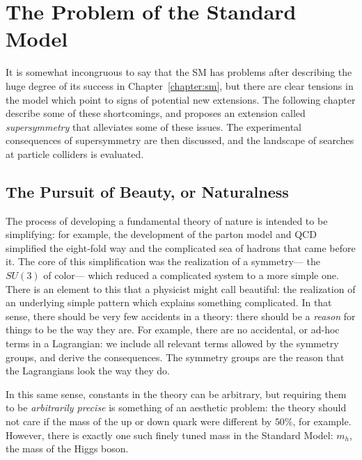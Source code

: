 \label{chapter:susy}

\section{The Problem of the Standard Model}
\label{chapter:susy:problems}

It is somewhat incongruous to say that the SM has problems after describing the huge degree of its success in Chapter~\ref{chapter:sm}, but there are clear tensions in the model which point to signs of potential new extensions. The following chapter describe some of these shortcomings, and proposes an extension called \textit{supersymmetry} that alleviates some of these issues. The experimental consequences of supersymmetry are then discussed, and the landscape of searches at particle colliders is evaluated.

\subsection{The Pursuit of Beauty, or Naturalness}
\label{chapter:susy:problems:naturalness}
The process of developing a fundamental theory of nature is intended to be simplifying: for example, the development of the parton model and QCD simplified the eight-fold way and the complicated sea of hadrons  that came before it.  The core of this simplification was the realization of a symmetry--- the $SU(3)$ of color--- which reduced a complicated system to a more simple one. There is an element to this that a physicist might call beautiful: the realization of an underlying simple pattern which explains something complicated. In that sense, there should be very few accidents in a theory: there should be a \textit{reason} for things to be the way they are. For example, there are no accidental, or ad-hoc terms in a Lagrangian: we include all relevant terms allowed by the symmetry groups, and derive the consequences. The symmetry groups are the reason that the Lagrangians look the way they do.

In this same sense, constants in the theory can be arbitrary, but requiring them to be \textit{arbitrarily precise} is something of an aesthetic problem: the theory should not care if the mass of the up or down quark were different by $50\%$, for example. However, there is exactly one such finely tuned mass in the Standard Model: $m_h$, the mass of the Higgs boson. 

